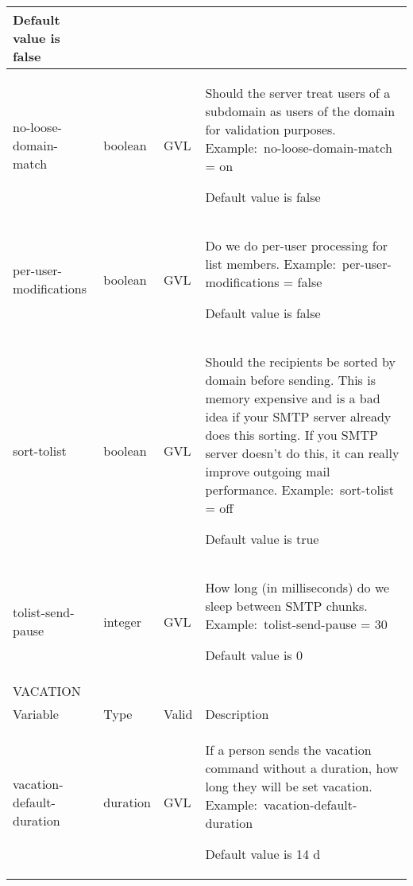 \documentclass{book}
\begin{document}
\begin{longtable}{p{30mm}llp{60mm}}
Default value is false \\
\hline
no-loose-domain-match & boolean & GVL & Should the server treat users of a subdomain as users of
the domain for validation purposes. Example: no-loose-domain-match = on

Default value is false \\
\hline
per-user-modifications & boolean & GVL & Do we do per-user processing for list members.
Example: per-user-modifications = false

Default value is false \\
\hline
sort-tolist & boolean & GVL & Should the recipients be sorted by domain before sending. This
is memory expensive and is a bad idea if your SMTP server already does this sorting. If you SMTP
server doesn't do this, it can really improve outgoing mail performance.
Example: sort-tolist = off

Default value is true \\
\hline
tolist-send-pause & integer & GVL & How long (in milliseconds) do we sleep between SMTP chunks.
Example: tolist-send-pause = 30

Default value is 0 \\
\hline
\multicolumn{4}{l}{VACATION}\\
\hline
Variable & Type & Valid & Description\\
\hline
vacation-default-duration & duration & GVL & If a person sends the vacation command without a
duration, how long they will be set vacation. Example: vacation-default-duration

Default value is 14 d \\
\hline
\end{longtable}
\end{document}
